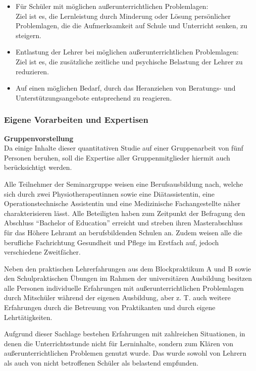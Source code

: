 \begin{itemize}
	\item Für Schüler mit möglichen außerunterrichtlichen Problemlagen:
	\\
	Ziel ist es, die Lernleistung durch Minderung oder Lösung persönlicher Problemlagen, die die Aufmerksamkeit auf Schule und Unterricht senken, zu steigern.
	\item Entlastung der Lehrer bei möglichen außerunterrichtlichen Problemlagen:
	 \\
	Ziel ist es, die zusätzliche zeitliche und psychische Belastung der Lehrer zu reduzieren. 
	\item Auf einen möglichen Bedarf, durch das Heranziehen von Beratungs- und Unterstützungsangebote entsprechend zu reagieren.
\end{itemize}

\subsubsection{Eigene Vorarbeiten und Expertisen}
\label{sec:EigeneVorarbeitenUndExpertisen}

\noindent
\textbf{Gruppenvorstellung}\\

\noindent
Da einige Inhalte dieser quantitativen Studie auf einer Gruppenarbeit von fünf Personen beruhen, soll die Expertise aller Gruppenmitglieder hiermit auch berücksichtigt werden.

Alle Teilnehmer der Seminargruppe weisen eine Berufsausbildung nach, welche sich durch zwei Physiotherapeutinnen sowie eine Diätassistentin, eine Operationstechnische Assistentin und eine Medizinische Fachangestellte näher charakterisieren lässt. Alle Beteiligten haben zum Zeitpunkt der Befragung den Abschluss "`Bachelor of Education"' erreicht und streben ihren Masterabschluss für das Höhere Lehramt an berufsbildenden Schulen an. Zudem weisen alle die berufliche Fachrichtung Gesundheit und Pflege im Erstfach auf, jedoch verschiedene Zweitfächer.

Neben den praktischen Lehrerfahrungen aus dem Blockpraktikum A und B sowie den Schulpraktischen Übungen im Rahmen der universitären Ausbildung besitzen alle Personen individuelle Erfahrungen mit außerunterrichtlichen Problemlagen durch Mitschüler während der eigenen Ausbildung, aber z. T. auch weitere Erfahrungen durch die Betreuung von Praktikanten und durch eigene Lehrtätigkeiten.

Aufgrund dieser Sachlage bestehen Erfahrungen mit zahlreichen Situationen, in denen die Unterrichtsstunde nicht für Lerninhalte, sondern zum Klären von außerunterrichtlichen Problemen genutzt wurde. Das wurde sowohl von Lehrern als auch von nicht betroffenen Schüler als belastend empfunden.

